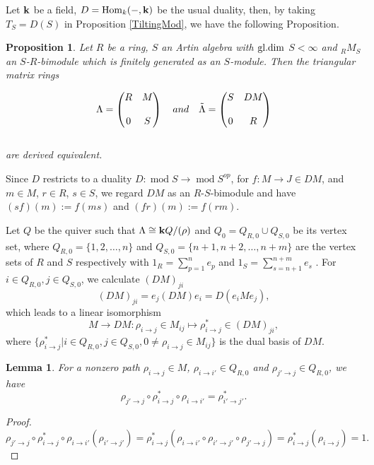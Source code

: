 \documentclass[a4paper, reqno]{amsart}
\newtheorem{lem}[thm]{Lemma}
\newtheorem{prop}[thm]{Proposition}
\theoremstyle{definition}
\theoremstyle{remark}
\numberwithin{equation}{section}
\def\Hom{{\rm Hom}}
\renewcommand{\mod}{\operatorname{mod}\nolimits}
\begin{document}
Let ${\bf k}$ be a field, $D = \Hom{_k} ({-}, {\bf k})$ be the usual duality, then, by taking $T_S = D(S)$ in Proposition \ref{TiltingMod}, we have the following Proposition.

\begin{prop} \cite[Corollary 4.9]{Lad2011} \label{prop 2.6}
    Let $R$ be a ring, $S$ an Artin algebra with $\rm{gl.dim}$ $S < \infty$ and ${_R}M{_S}$ an $S$-$R$-bimodule which is finitely generated as an $S$-module. Then the triangular matrix
rings

$$
     \Lambda = \left( \begin{matrix}
     R  & M      \cr\cr
     0  & S      
\end{matrix}\right)\,\,\,\,\,\,
 and\,\,\,\,\,\,
\Tilde{\Lambda} = \left( \begin{matrix}
     S  & DM      \cr\cr
     0  & R      
\end{matrix}\right)
 $$\\
 are derived equivalent. 
\end{prop}

Since $D$ restricts to a duality $D : \mod S \to \mod S^{op}$, for
$f:M \to J \in DM$, and $m\in M$, $r\in R $, $s\in S$, we regard $DM$ as an $R$-$S$-bimodule and have 
 $(sf)(m) :=  f(ms) $ and $ (fr)(m) :=  f(rm) $. 
 
 Let $Q$ be the quiver such that $\Lambda \cong {\bf k}Q/(\rho)$ and
  $Q_0 = Q_{R,0}\cup Q_{S,0}$ be its vertex set, where $Q_{R,0}= \{1,2,\dots,n\}$ and $Q_{S,0}= \{ n+1,n+2,\dots,n+m\}$ are the vertex sets of $R$ and $S$ respectively with $1_R= \sum_{p=1}^{n} e_p$ and $1_S= \sum_{s=n+1}^{n+m} e_s$ . For $i\in Q_{R,0}, j\in Q_{S,0}$, we calculate $(DM)_{ji} $
 $$ (DM)_{ji} = e_j (DM)e_i = D(e_i M e_j),  $$ 
 which leads to a linear isomorphism
 $$ M \to DM: \rho_{i\to j} \in M_{ij} \mapsto \rho_{i\to j}^{*}\in (DM)_{ji}, $$ 
 where $\{\rho_{i\to j}^{*}|i\in Q_{R,0}, j\in Q_{S,0}, 0\neq \rho_{i\to j}\in M_{ij} \}$ is the dual basis of $DM$. 

 \begin{lem} \label{lem 2.12}
     For a nonzero path $ \rho_{i\to j} \in M $, $\rho_{i\to i'}\in Q_{R,0}$ and $\rho_{j'\to j}\in Q_{R,0}$, we have $$ \rho_{j'\to j} \circ \rho_{i\to j}^{*} \circ \rho_{i\to i'} = \rho_{i'\to j'}^{*}.$$
 \end{lem}

 \begin{proof}
     $ \rho_{j'\to j} \circ \rho_{i\to j}^{*} \circ \rho_{i\to i'} (\rho_{i'\to j'}) = \rho_{i\to j}^{*}(\rho_{i\to i'} \circ \rho_{i'\to j'}\circ\rho_{j'\to j}) =\rho_{i\to j}^{*}(\rho_{i\to j}) = 1 .$
 \end{proof}
\end{document}
